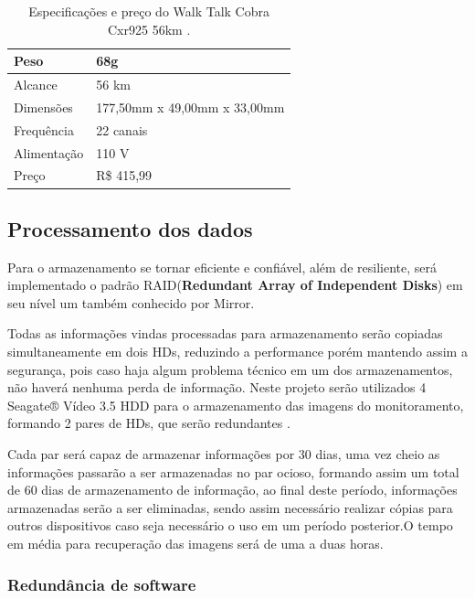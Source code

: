 \begin{table}[H]
\centering
\begin{tabular}{|l|l|}
\hline
Peso        & 68g                          \\ \hline
Alcance     & 56 km                        \\ \hline
Dimensões   & 177,50mm x 49,00mm x 33,00mm \\ \hline
Frequência  & 22 canais                    \\ \hline
Alimentação & 110 V                        \\ \hline
Preço       & R\$ 415,99                   \\ \hline
\end{tabular}
\caption{Especificações e preço do Walk Talk Cobra Cxr925 56km \cite{walk}.}
\label{table:walk}
\end{table}

\subsection{Processamento dos dados}

Para o armazenamento se tornar eficiente e confiável, além de resiliente, será implementado o
padrão RAID(\textbf{Redundant Array of Independent Disks}) em seu nível um também conhecido por
Mirror.

Todas as informações vindas processadas para armazenamento serão copiadas
simultaneamente em dois HDs, reduzindo a performance porém mantendo assim a segurança,
pois caso haja algum problema técnico em um dos armazenamentos, não haverá nenhuma
perda de informação. Neste projeto serão utilizados 4 Seagate® Vídeo 3.5 HDD para o
armazenamento das imagens do monitoramento, formando 2 pares de HDs, que serão
redundantes \cite{raid}.

Cada par será capaz de armazenar informações por 30 dias, uma vez cheio as informações passarão a ser armazenadas no par ocioso, formando assim um total de 60 dias de armazenamento de informação, ao final deste período, informações armazenadas serão a ser eliminadas, sendo assim necessário realizar cópias para outros dispositivos caso seja necessário o uso em um período posterior.O tempo em média para recuperação das imagens será de uma a duas horas.

\subsubsection{Redundância de software}

